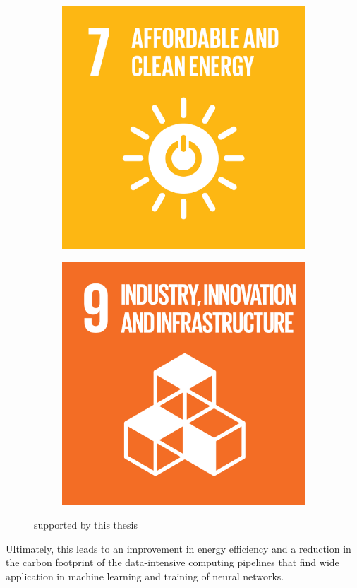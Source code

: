 \begin{figure}
    \centering
    \begin{subfigure}[b]{0.5\linewidth}
        \centering
        \includegraphics[width=0.6\linewidth]{figures/1-introduction/E_SDG_goals_icons-07.png} 
        \label{fig:sdg07}
    \end{subfigure}\hfill
    \begin{subfigure}[b]{0.5\linewidth}
        \centering
        \includegraphics[width=0.6\linewidth]{figures/1-introduction/E_SDG-goals_icons-09.png}
        \label{fig:sdg09}
	\end{subfigure}
	\caption{ supported by this thesis}
	\label{fig:sdgs}
\end{figure}

Ultimately, this leads to an improvement in energy efficiency and a reduction in the carbon footprint of the data-intensive computing pipelines that find wide application in machine learning and training of neural networks.

